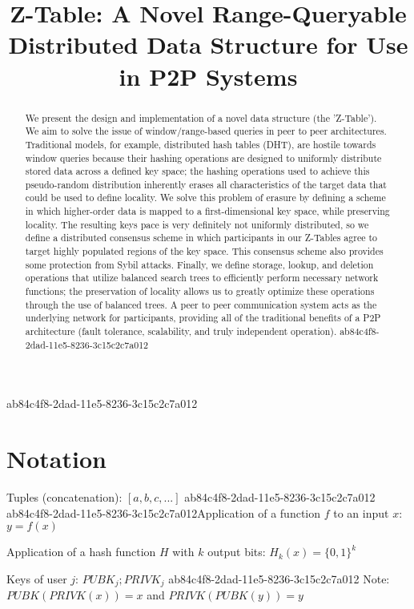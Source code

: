 \documentclass[12pt]{article}
\title{Z-Table: A Novel Range-Queryable Distributed Data Structure for Use in P2P Systems}
\begin{document}
ab84c4f8-2dad-11e5-8236-3c15c2c7a012\maketitle

\begin{abstract}
We present the design and implementation of a novel data structure (the 'Z-Table'). We aim to solve the issue of window/range-based queries in peer to peer architectures. Traditional models, for example,  distributed hash tables (DHT), are hostile towards window queries because their hashing operations are designed to uniformly distribute stored data across a defined key space; the hashing operations used to achieve this pseudo-random distribution inherently erases all characteristics of the target data that could be used to define locality. We solve this problem of erasure by defining a scheme in which higher-order data is mapped to a first-dimensional key space, while preserving locality. The resulting keys pace is very definitely not uniformly distributed, so we define a distributed consensus scheme in which participants in our Z-Tables agree to target highly populated regions of the key space. This consensus scheme also provides some protection from Sybil attacks. Finally, we define storage, lookup, and deletion operations that utilize balanced search trees to efficiently perform necessary network functions; the preservation of locality allows us to greatly optimize these operations through the use of balanced trees. A peer to peer communication system acts as the underlying network for participants, providing all of the traditional benefits of a P2P architecture (fault tolerance, scalability, and truly independent operation).
ab84c4f8-2dad-11e5-8236-3c15c2c7a012\end{abstract}

\section{Notation}

Tuples (concatenation): $[a,b,c,...]$
ab84c4f8-2dad-11e5-8236-3c15c2c7a012
ab84c4f8-2dad-11e5-8236-3c15c2c7a012Application of a function $f$ to an input $x$: $y=f(x)$

Application of a hash function $H$ with $k$ output bits: $H_{k}(x) = \{0,1\}^k$

Keys of user $j$: $ PUBK_j; PRIVK_j $
ab84c4f8-2dad-11e5-8236-3c15c2c7a012
Note: $PUBK(PRIVK(x)) = x$ and $PRIVK(PUBK(y)) = y$~
\end{document}
